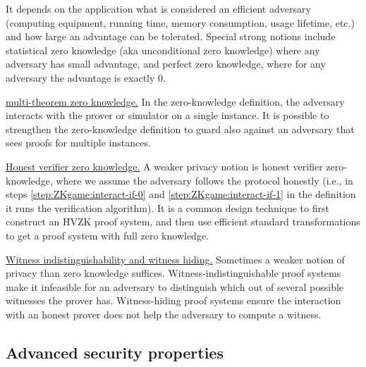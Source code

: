 It depends on the application what is considered an efficient adversary (computing equipment, running time, memory consumption, usage lifetime, etc.) and how large an advantage can be tolerated. 
Special strong notions include statistical zero knowledge (aka unconditional zero knowledge) where any adversary has small advantage, and perfect zero knowledge, where for any adversary the advantage is exactly 0.



\underline{multi-theorem zero knowledge.} 
In the zero-knowledge definition, the adversary interacts with the prover or simulator on a single instance. 
It is possible to strengthen the zero-knowledge definition to guard also against an adversary that sees proofs for multiple instances.
 
\underline{Honest verifier zero knowledge.} 
	A weaker privacy notion is honest verifier zero-knowledge, where we assume the adversary follows the protocol honestly 
(i.e., in steps \ref{step:ZKgame:interact-if-0} and \ref{step:ZKgame:interact-if-1} in the definition it runs the verification algorithm). 
	It is a common design technique to first construct an HVZK proof system, and then use efficient standard transformations to get a proof system with full zero knowledge.
 
\underline{Witness indistinguishability and witness hiding.} 
Sometimes a weaker notion of privacy than zero knowledge suffices. 
Witness-indistinguishable proof systems make it infeasible for an adversary to distinguish which out of several possible witnesses the prover has. Witness-hiding proof systems ensure the interaction with an honest prover does not help the adversary to compute a witness.


\subsection{Advanced security properties}
\label{sec:security:defs-props:advanced-security-properties}

